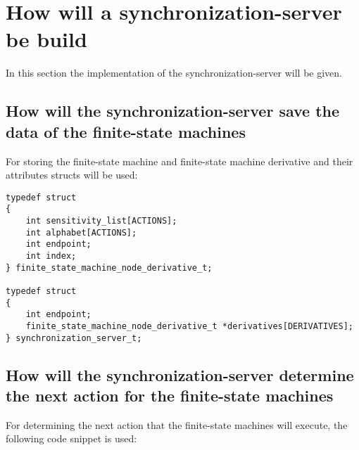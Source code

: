 \hypertarget{how-will-a-synchronization-server-be-build}{%
\section{How will a synchronization-server be
build}\label{how-will-a-synchronization-server-be-build}}

In this section the implementation of the synchronization-server will be
given.

\hypertarget{how-will-the-synchronization-server-save-the-data-of-the-finite-state-machines}{%
\subsection{How will the synchronization-server save the data of the
finite-state
machines}\label{how-will-the-synchronization-server-save-the-data-of-the-finite-state-machines}}

For storing the finite-state machine and finite-state machine derivative
and their attributes structs will be used:

\begin{verbatim}
typedef struct
{
    int sensitivity_list[ACTIONS];
    int alphabet[ACTIONS];
    int endpoint;
    int index;
} finite_state_machine_node_derivative_t;

typedef struct
{
    int endpoint;
    finite_state_machine_node_derivative_t *derivatives[DERIVATIVES];
} synchronization_server_t;
\end{verbatim}

\hypertarget{how-will-the-synchronization-server-determine-the-next-action-for-the-finite-state-machines}{%
\subsection{How will the synchronization-server determine the next
action for the finite-state
machines}\label{how-will-the-synchronization-server-determine-the-next-action-for-the-finite-state-machines}}

For determining the next action that the finite-state machines will
execute, the following code snippet is used:


